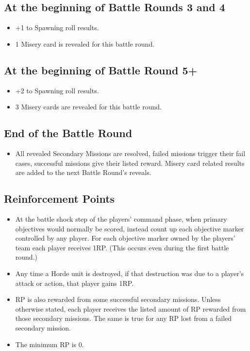 \documentclass{HordeModeTarot}
\begin{document}
\subsection*{At the beginning of Battle Rounds 3 and 4}

\begin{itemize}
\item{} +1 to Spawning roll results.
\item{} 1 Misery card is revealed for this battle round.
\end{itemize}

\subsection*{At the beginning of Battle Round 5+}

\begin{itemize}
\item{} +2 to Spawning roll results.
\item{} 3 Misery cards are revealed for this battle round.
\end{itemize}

\subsection*{End of the Battle Round}

\begin{itemize}
\item{} All revealed Secondary Missions are resolved, failed missions trigger their fail cases, successful missions give their listed reward. Misery card related results are added to the next Battle Round's reveals.
\end{itemize}

\subsection*{Reinforcement Points}

\begin{itemize}
\item{} At the battle shock step of the players' command phase, when primary objectives would normally be scored, instead count up each objective marker controlled by any player.  For each objective marker owned by the players' team each player receives 1RP.  (This occurs even during the first battle round.)
\item{} Any time a Horde unit is destroyed, if that destruction was due to a player's attack or action, that player gains 1RP.
\item{} RP is also rewarded from some successful secondary missions. Unless otherwise stated, each player receives the listed amount of RP rewarded from those secondary missions. The same is true for any RP lost from a failed secondary mission.
\item{} The minimum RP is 0.
\end{itemize}
\end{document}
